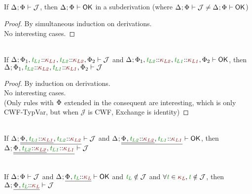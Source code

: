 \documentclass[11pt]{article}
\begin{document}
    \subsection*{}
    \begin{lemma}[COK]
        If $\J$, then $\ContextWellFormed$ in a subderivation (where $\J\neq\ContextWellFormed$)
    \end{lemma}
    \begin{proof}
        By simultaneous induction on derivations. \\
        No interesting cases.
    \end{proof}
    \begin{lemma}[Exchange]
        \vphantom{.}\\
        If $\J[\HoleCtx\TypVarCtx[][1],\typvar[L1]\KndAssump\knd[L1],\typvar[L2]\KndAssump\knd[L2],\TypVarCtx[][2]]$ and $\ContextWellFormed[\HoleCtx\TypVarCtx[][1],\typvar[L2]\KndAssump\knd[L2],\typvar[L1]\KndAssump\knd[L1],\TypVarCtx[][2]]$, then $\J[\HoleCtx\TypVarCtx[][1],\typvar[L2]\KndAssump\knd[L2],\typvar[L1]\KndAssump\knd[L1],\TypVarCtx[][2]]$
    \end{lemma}
    \begin{proof}
        By induction on derivations. \\
        No interesting cases. \\
        (Only rules with $\TypVarCtx$ extended in the consequent are interesting, which is only CWF-TypVar, but when $\mathcal{J}$ is CWF, Exchange is identity)
    \end{proof}
    \begin{corollary}
        \vphantom{.}\\
        If $\J[\HoleCtx\xxExtendTypVarCtx[][L1]{\knd[L1]}[L2]{\knd[L2]}]$ and $\ContextWellFormed[\HoleCtx\xxExtendTypVarCtx[][L2]{\knd[L2]}[L1]{\knd[L1]}]$, then $\J[\HoleCtx\xxExtendTypVarCtx[][L2]{\knd[L2]}[L1]{\knd[L1]}]$
    \end{corollary}
    \begin{lemma}[Weakening]
        \vphantom{.}\\
        If $\J$ and $\ContextWellFormed[\HoleCtx\xExtendTypVarCtx[][L][\knd[L]]]$ and $\typvar[L]\notin\mathcal{J}$ and $\forall\typvar\in\knd[L],\typvar\notin\mathcal{J}$, then $\J[\HoleCtx\xExtendTypVarCtx[][L][\knd[L]]]$
    \end{lemma}
\end{document}
